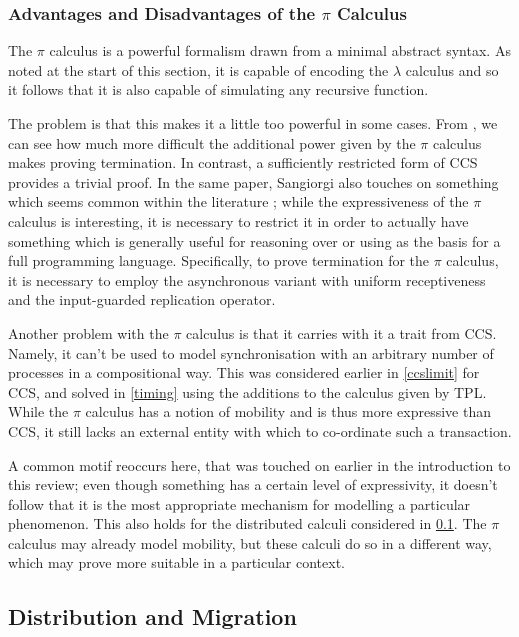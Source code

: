 \subsubsection{Advantages and Disadvantages of the $\pi$ Calculus}

The $\pi$ calculus is a powerful formalism drawn from a minimal
abstract syntax.  As noted at the start of this section, it is capable
of encoding the $\lambda$ calculus and so it follows that it is also
capable of simulating any recursive function.

The problem is that this makes it a little too powerful in some cases.
From \cite{sangiorgi:types-or}, we can see how much more difficult the
additional power given by the $\pi$ calculus makes proving
termination.  In contrast, a sufficiently restricted form of CCS
provides a trivial proof.  In the same paper, Sangiorgi also touches
on something which seems common within the literature
\cite{join,stefani:kells,wojciechowski:phd,failure2}; while the
expressiveness of the $\pi$ calculus is interesting, it is necessary
to restrict it in order to actually have something which is generally
useful for reasoning over or using as the basis for a full programming
language.  Specifically, to prove termination for the $\pi$ calculus,
it is necessary to employ the asynchronous variant with uniform
receptiveness and the input-guarded replication operator.

Another problem with the $\pi$ calculus is that it carries with it a
trait from CCS.  Namely, it can't be used to model synchronisation
with an arbitrary number of processes in a compositional way.  This
was considered earlier in \ref{ccslimit} for CCS, and solved in
\ref{timing} using the additions to the calculus given by TPL.  While
the $\pi$ calculus has a notion of mobility and is thus more
expressive than CCS, it still lacks an external entity with which to
co-ordinate such a transaction.  

A common motif reoccurs here, that was touched on earlier in the
introduction to this review; even though something has a certain level
of expressivity, it doesn't follow that it is the most appropriate
mechanism for modelling a particular phenomenon.  This also holds for
the distributed calculi considered in \ref{migration}.  The $\pi$
calculus may already model mobility, but these calculi do so in a
different way, which may prove more suitable in a particular context.
 
\subsection{Distribution and Migration}
\label{migration}

